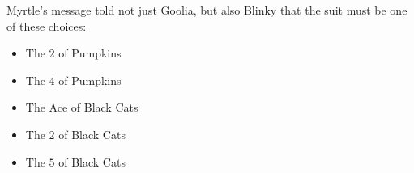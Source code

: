 


%
%
%
%
%
%
%

Myrtle's message told not just Goolia, but also Blinky that the suit must
be one of these choices:

\begin{itemize}
  \item The \(2\) of Pumpkins
  \item The \(4\) of Pumpkins
  \item The Ace of Black Cats
  \item The \(2\) of Black Cats
  \item The \(5\) of Black Cats
\end{itemize}

